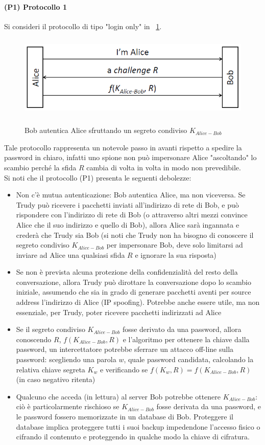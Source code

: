 \paragraph{(P1) Protocollo 1}
Si consideri il protocollo di tipo "login only" in \figurename~\ref{fig:ImgS11bis}.
\begin{figure}[htbp]
	\centering%
	\subfigure%
	{\includegraphics[height=4cm, width=12cm, keepaspectratio]{Immagini/autenticazione/ImgS11bis.png}}
	\caption{Bob autentica Alice sfruttando un segreto condiviso $K_{Alice-Bob}$\label{fig:ImgS11bis}} 	
\end{figure}
Tale protocollo rappresenta un notevole passo in avanti rispetto a spedire la password in chiaro, infatti uno spione non può impersonare Alice "ascoltando" lo scambio perché la sfida $R$ cambia di volta in volta in modo non prevedibile.\\
Si noti che il protocollo (P1) presenta le seguenti debolezze:
\begin{itemize}
	\item Non c'è mutua autenticazione: Bob autentica Alice, ma non viceversa. Se Trudy può ricevere i pacchetti inviati all'indirizzo di rete di Bob, e può rispondere con l'indirizzo di rete di Bob (o attraverso altri mezzi convince Alice che il suo indirizzo e quello di Bob), allora Alice sarà ingannata e crederà che Trudy sia Bob (si noti che Trudy non ha bisogno di conoscere il segreto condiviso $K_{Alice-Bob}$ per impersonare Bob, deve solo limitarsi ad inviare ad Alice una qualsiasi sfida $R$ e ignorare la sua risposta)
	\item Se non è prevista alcuna protezione della confidenzialità del resto della conversazione, allora Trudy può dirottare la conversazione dopo lo scambio iniziale, assumendo che sia in grado di generare pacchetti aventi per source address l'indirizzo di Alice (IP spoofing). Potrebbe anche essere utile, ma non essenziale, per Trudy, poter ricevere pacchetti indirizzati ad Alice
	\item Se il segreto condiviso $K_{Alice-Bob}$ fosse derivato da una password, allora conoscendo $R$, $f(K_{Alice-Bob}, R)$ e l'algoritmo per ottenere la chiave dalla password, un intercettatore potrebbe sferrare un attacco off-line sulla password: scegliendo una parola $w$, quale password candidata, calcolando la relativa chiave segreta $K_{w}$ e verificando se $f(K_{w}, R) = f(K_{Alice-Bob}, R)$ (in caso negativo ritenta)
	\item Qualcuno che acceda (in lettura) al server Bob potrebbe ottenere $K_{Alice-Bob}$: ciò è particolarmente rischioso se $K_{Alice-Bob}$ fosse derivata da una password, e le password fossero memorizzate in un database di
	Bob. Proteggere il database implica proteggere tutti i suoi backup impedendone l'accesso fisico o cifrando il contenuto e proteggendo in qualche modo la chiave di cifratura.
\end{itemize}
